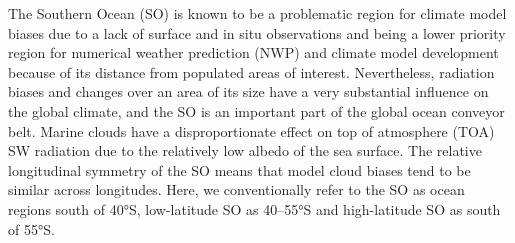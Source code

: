 \documentclass[12pt,a4paper]{article}
\begin{document}
The Southern Ocean (SO) is known to be a problematic region for climate model
biases due to a lack of surface and in situ observations and
being a lower priority region for numerical weather prediction (NWP) and
climate model development because of its distance from populated areas of
interest.  Nevertheless, radiation biases and changes over an area of its size
have a very substantial influence on the global climate, and the SO is an
important part of the global ocean conveyor belt.  Marine clouds have
a disproportionate effect on top of atmosphere (TOA) SW radiation due to the
relatively low albedo of the sea surface.  The relative longitudinal symmetry
of the SO means that model cloud biases tend to be similar across longitudes.
Here, we conventionally refer to the SO as ocean regions south of 40°S,
low-latitude SO as 40--55°S and high-latitude SO as south of 55°S.
\end{document}
